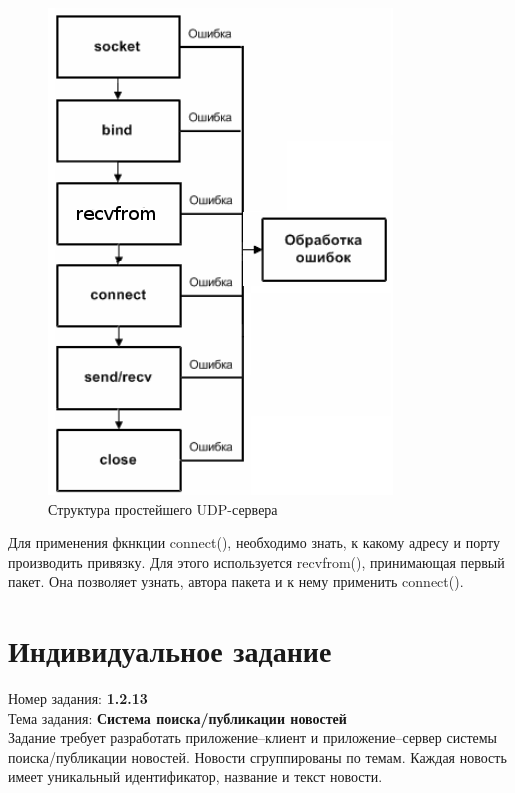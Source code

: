 \documentclass[a4paper]{article}
\begin{document}
\begin{figure}[H]
\begin{center}
\includegraphics[scale=0.5]{pics/tudps.png}
\caption{Структура простейшего UDP-сервера}
\label{pic:tudps}
\end{center}
\end{figure}

Для применения фкнкции connect(), необходимо знать, к какому адресу и порту производить привязку. Для этого используется recvfrom(), принимающая первый пакет. Она позволяет узнать, автора пакета и к нему применить connect().

\section{Индивидуальное задание}
\noindent Номер задания: \textbf{1.2.13}\\
Тема задания: \textbf{Система поиска/публикации новостей}\\[1cm]

Задание требует разработать приложение–клиент и приложение–сервер системы поиска/публикации новостей. Новости сгруппированы по темам. Каждая новость имеет уникальный идентификатор, название и текст новости.
\end{document}

